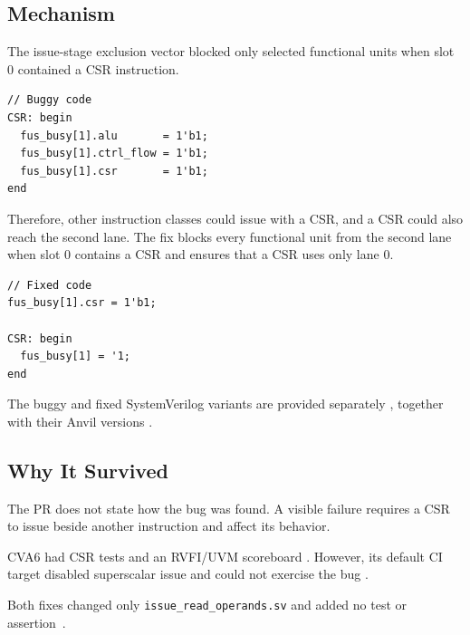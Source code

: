 \documentclass[conference]{IEEEtran}
\begin{document}

\subsection{Mechanism}

The issue-stage exclusion vector blocked only selected functional units when
slot 0 contained a CSR instruction.

\begin{lstlisting}
// Buggy code
CSR: begin
  fus_busy[1].alu       = 1'b1;
  fus_busy[1].ctrl_flow = 1'b1;
  fus_busy[1].csr       = 1'b1;
end
\end{lstlisting}

Therefore, other instruction classes could issue with a CSR, and a CSR could
also reach the second lane. The fix blocks every functional unit from the
second lane when slot 0 contains a CSR and ensures that a CSR uses only lane 0.

\begin{lstlisting}
// Fixed code
fus_busy[1].csr = 1'b1;

CSR: begin
  fus_busy[1] = '1;
end
\end{lstlisting}

The buggy and fixed SystemVerilog variants are provided separately
\cite{bug5-sv-buggy,bug5-sv-fixed}, together with their Anvil versions
\cite{bug5-anvil-buggy,bug5-anvil-fixed}.




\subsection{Why It Survived}

The PR does not state how the bug was found. A visible failure requires a CSR
to issue beside another instruction and affect its behavior.



CVA6 had CSR tests and an RVFI/UVM scoreboard
\cite{cva6-csr-tests,cva6-verification-scoreboard}. However, its default CI
target disabled superscalar issue and could not exercise the bug
\cite{cva6-parent,cva6-ci,cva6-config}.

Both fixes changed only \texttt{issue\_read\_operands.sv} and added
no test or assertion~\cite{cva6-csr-hazard-commit,cva6-csr-port-commit}.
\end{document}
